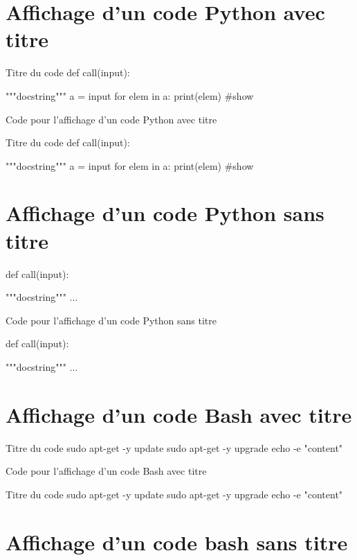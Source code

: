 \section{Affichage d'un code Python avec titre}


\begin{Python}{Titre du code}
def call(input):

  """docstring"""
  a = input
  for elem in a:
    print(elem) #show
\end{Python}

\begin{Latex}{Code pour l'affichage d'un code Python avec titre}
  \begin{Python}{Titre du code}
    def call(input):
    
      """docstring"""
      a = input
      for elem in a:
        print(elem) #show
    \end{Python}
\end{Latex}

\section{Affichage d'un code Python sans titre}


\begin{Python}
def call(input):

  """docstring"""
  ...
\end{Python}

\begin{Latex}{Code pour l'affichage d'un code Python sans titre}
  \begin{Python}
    def call(input):
    
      """docstring"""
      ...
    \end{Python}
\end{Latex}


\section{Affichage d'un code Bash avec titre}


\begin{Bash}{Titre du code}
sudo apt-get -y update
sudo apt-get -y upgrade
echo -e "content"
\end{Bash}

\begin{Latex}{Code pour l'affichage d'un code Bash avec titre}
  \begin{Bash}{Titre du code}
    sudo apt-get -y update
    sudo apt-get -y upgrade
    echo -e "content"
    \end{Bash}
\end{Latex}

\section{Affichage d'un code bash sans titre}



